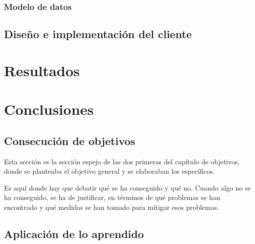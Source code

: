\documentclass[a4paper, 12pt]{book}
\begin{document}
\subsection{Modelo de datos}


\section{Diseño e implementación del cliente} 
\label{sec:arquitecturaCliente}


\cleardoublepage
\chapter{Resultados}





\cleardoublepage
\chapter{Conclusiones}
\label{chap:conclusiones}


\section{Consecución de objetivos}
\label{sec:consecucion-objetivos}

Esta sección es la sección espejo de las dos primeras del capítulo de objetivos,
donde se planteaba el objetivo general y se elaboraban los específicos.

Es aquí donde hay que debatir qué se ha conseguido y qué no. Cuando algo no
se ha conseguido, se ha de justificar, en términos de qué problemas se han
encontrado y qué medidas se han tomado para mitigar esos problemas.


\section{Aplicación de lo aprendido}
\label{sec:aplicacion}
\end{document}
